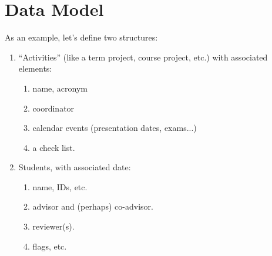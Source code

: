 \documentclass[10pt]{article}
\begin{document}
\begin{codestore}[ActivityFunctions]


\end{codestore}

\begin{codestore}[ActivityUseDemo]
  
  
  
\end{codestore}


\begin{codestore}[ActivityUseDemo]
   

  
\end{codestore}






\section{Data Model}\label{DataModel}
As an example, let's define two structures:
\begin{enumerate}
  \item ``Activities'' (like a term project, course project, etc.)  with associated 
elements: 
\begin{enumerate}
  \item name, acronym
  \item coordinator
  \item calendar events (presentation dates, exams...)
  \item a check list.
\end{enumerate}

  \item Students, with associated date:
\begin{enumerate}
  \item name, IDs, etc.
  \item advisor and (perhaps) co-advisor.
  \item reviewer(s).
  \item flags, etc.
\end{enumerate}
  
  
\end{enumerate}
\end{document}
